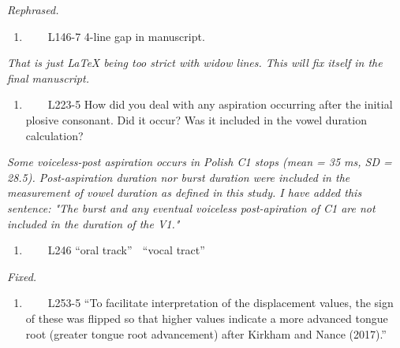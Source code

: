 \documentclass[]{article}
\providecommand{\tightlist}{%
  \setlength{\itemsep}{0pt}\setlength{\parskip}{0pt}}
\begin{document}
\begin{adjustwidth}{1cm}{} \textit{
Rephrased.
} \end{adjustwidth}

\begin{enumerate}
\def\labelenumi{\arabic{enumi}.}
\setcounter{enumi}{4}
\tightlist
\item
  ~~~~L146-7 4-line gap in manuscript.
\end{enumerate}

\begin{adjustwidth}{1cm}{} \textit{
That is just LaTeX being too strict with widow lines. This will fix itself in the final manuscript.
} \end{adjustwidth}

\begin{enumerate}
\def\labelenumi{\arabic{enumi}.}
\setcounter{enumi}{5}
\tightlist
\item
  ~~~~L223-5 How did you deal with any aspiration occurring after the
  initial plosive consonant. Did it occur? Was it included in the vowel
  duration calculation?
\end{enumerate}

\begin{adjustwidth}{1cm}{} \textit{
Some voiceless-post aspiration occurs in Polish C1 stops (mean = 35 ms, SD = 28.5).
Post-aspiration duration nor burst duration were included in the measurement of vowel duration as defined in this study.
I have added this sentence: "The burst and any eventual voiceless post-apiration of C1 are not included in the duration of the V1."
} \end{adjustwidth}

\begin{enumerate}
\def\labelenumi{\arabic{enumi}.}
\setcounter{enumi}{6}
\tightlist
\item
  ~~~~L246 ``oral track''  ``vocal tract''
\end{enumerate}

\begin{adjustwidth}{1cm}{} \textit{
Fixed.
} \end{adjustwidth}

\begin{enumerate}
\def\labelenumi{\arabic{enumi}.}
\setcounter{enumi}{7}
\tightlist
\item
  ~~~~L253-5 ``To facilitate interpretation of the displacement values,
  the sign of these was flipped so that higher values indicate a more
  advanced tongue root (greater tongue root advancement) after Kirkham
  and Nance (2017).''
\end{enumerate}
\end{document}
